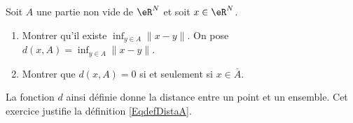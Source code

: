 \begin{exercice}[\coolexo]\label{exoEspVectoNorme0007}


Soit  $A$ une partie non vide de $\eR^N $ et soit $ x \in \eR^N$.
\begin{enumerate}
	\item
 Montrer qu'il existe  $\inf_{y \in A} \| x-y \|$.
         On pose $d(x,A)= \inf_{y \in A} \| x-y \|$.
\item
 Montrer que  $d(x,A)=0 $ si et seulement si $x \in \overline{A}$.
		
\end{enumerate}
La fonction $d$ ainsi définie donne la distance entre un point et un ensemble. Cet exercice justifie la définition \eqref{EqdefDistaA}.

\end{exercice}

